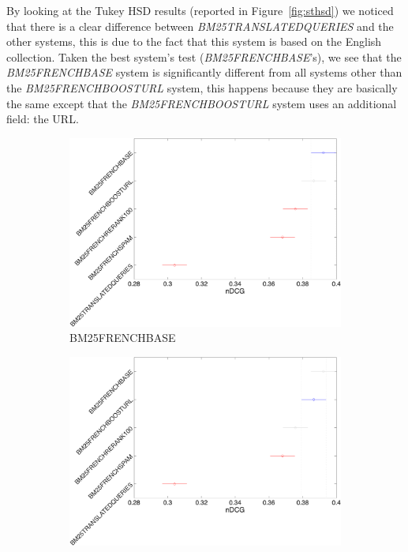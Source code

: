 \par
By looking at the Tukey HSD results (reported in Figure~\ref{fig:sthsd}) we noticed that there is a clear difference between \textit{BM25TRANSLATEDQUERIES} and the other systems, this is due to the fact that this system is based on the English collection. Taken the best system's test (\textit{BM25FRENCHBASE}'s), we see that the \textit{BM25FRENCHBASE} system is significantly different from all systems other than the \textit{BM25FRENCHBOOSTURL} system, this happens because they are basically the same except that the \textit{BM25FRENCHBOOSTURL} system uses an additional field: the URL.
\begin{figure}[tb]
     \centering
     \begin{subfigure}[b]{0.49\textwidth}
         \centering
         \includegraphics[width=\textwidth]{figure/shortterm/tukeyhsd-1.png}
         \caption{BM25FRENCHBASE}
         \label{fig:sthsd1}
     \end{subfigure}
     \hfill
     \begin{subfigure}[b]{0.49\textwidth}
         \centering
         \includegraphics[width=\textwidth]{figure/shortterm/tukeyhsd-2.png}

\end{subfigure}
\end{figure}
